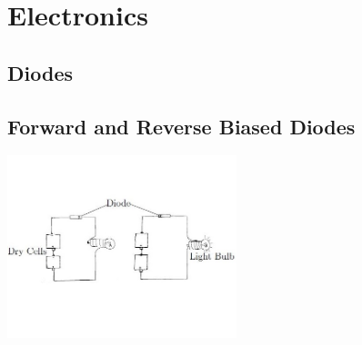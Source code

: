 \section{Electronics} 

\begin{multicols}{2}


\section*{Diodes} 


\subsection{Forward and Reverse Biased Diodes}

\begin{center}
\includegraphics[width=0.5\textwidth]{./img/diodes.jpg}
\end{center}


\end{multicols}

